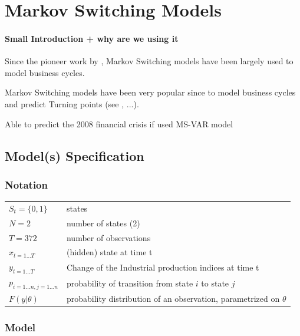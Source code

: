 \documentclass{article}[]
\begin{document}
\chapter{Markov Switching Models}


\subsubsection{Small Introduction + why are we using it}

Since the pioneer work by \cite{hamilton_new_1989}, Markov Switching models have been largely used to model business cycles.


Markov Switching models have been very popular since \cite{hamilton_new_1989} to model business cycles and predict Turning points (see \cite{duprey_how_2017}, ...).

Able to predict the 2008 financial crisis if used MS-VAR model \cite{gadea_rivas_failure_2015}




\section{Model(s) Specification}

\subsection{Notation}

\begin{tabular}{l l}
    $S_t = \{0, 1\}$&   states        \\
    $N = 2$         &   number of states (2) \\
    $T = 372 $            & 	number of observations  \\
    $x_{t=1\dots T}$ & (hidden) state at time t \\
    $y_{t=1\dots T}$ 	& Change of the Industrial production indices at time t \\
    $p_{i=1\dots n,j=1\dots n}$ & probability of transition from state $i$ to state $j$ \\
    $F(y|\theta )$	&  probability distribution of an observation, parametrized on $\theta$ \\
\end{tabular}



\subsection{Model}
\end{document}
